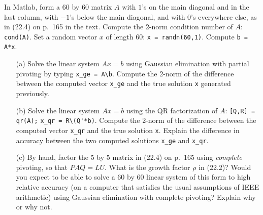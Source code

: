 \documentclass[10pt]{article}
\begin{document}
\begin{problem}[Exercise 2]
In Matlab, form a \(60\) by \(60\) matrix \(A\) with \(1\)'s on the main diagonal and in the last column, with \(-1\)'s below the main diagonal, and with
\(0\)'s everywhere else, as in (22.4) on p.~165 in the text.  Compute the 2-norm condition number of \(A\):  \verb+cond(A)+.  Set a random
vector \(x\) of length \(60\):  \verb+x = randn(60,1)+.  Compute \verb+b = A*x+. 
\begin{enumerate}
    \item[(a)] Solve the linear system \(A x = b\) using Gaussian elimination with partial pivoting by typing \verb+x_ge = A\b+.  Compute the 2-norm of the difference between the computed vector \verb+x_ge+ and the true solution \verb+x+ generated previously.
    \item[(b)] Solve the linear system \(Ax=b\) using the QR factorization of \(A\): \verb+[Q,R] = qr(A);+ \verb+x_qr = R\(Q'*b)+.  Compute the 2-norm of the difference between the computed vector \verb+x_qr+ and the true solution \verb+x+.  Explain the difference in accuracy between the two computed solutions \verb+x_ge+ and \verb+x_qr+.  
    \item[(c)] By hand, factor the \(5\) by \(5\) matrix in (22.4) on p.~165 using {\em complete} pivoting, so that \(PAQ = LU\).  What is the growth factor \(\rho\) in (22.2)? Would you expect to be able to solve a \(60\) by \(60\) linear system of this form to high relative accuracy (on a computer that satisfies the usual assumptions of IEEE arithmetic) using Gaussian elimination with complete pivoting?  Explain why or why not.
\end{enumerate}
\end{problem}
\end{document}
